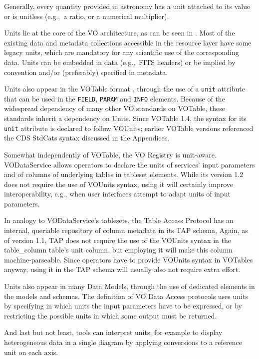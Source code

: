\documentclass[11pt,a4paper]{ivoa}
\def\eg{e.g.,~}
\begin{document}
Generally, every quantity provided in astronomy has a unit attached to
its value or is unitless (\eg a ratio, or a numerical multiplier).

Units lie at the core of the VO architecture, as can be seen in .
Most of the existing data and metadata collections accessible in the resource
layer have some legacy units, which are mandatory for any scientific use of
the corresponding data.  Units can be embedded in data (\eg FITS headers) or be
implied by convention and/or (preferably) specified in metadata.

Units also appear in the VOTable format \citep{2019ivoa.spec.1021O}, through the use
of a {\tt unit} attribute that can be used in the {\tt FIELD}, {\tt PARAM} and {\tt INFO}
elements. Because of the widespread dependency of many other VO standards on VOTable,
these standards inherit a dependency on Units.
Since VOTable 1.4, the syntax for its {\tt unit} attribute is
declared to follow VOUnits; earlier VOTable versions
referenced the CDS StdCats syntax discussed in the Appendices.

Somewhat independently of VOTable, the VO Registry is unit-aware.
VODataService \citep{2021ivoa.spec.1102D} allows operators to declare
the units of services' input parameters and of columns of underlying
tables in tableset elements.  While its version 1.2 does not require the
use of VOUnits syntax, using it will certainly improve interoperability,
e.g., when user interfaces attempt to adapt units of input parameters.

In analogy to VODataService's tablesets, the Table Access Protocol
\citep{2019ivoa.spec.0927D} has an internal, queriable repository of
column metadata in its TAP schema, Again, as of version 1.1, TAP does
not require the use of the VOUnits syntax in the table\_column table's
unit column, but employing it will make this column machine-parseable.
Since operators have to provide VOUnits syntax in VOTables anyway, using
it in the TAP schema will usually also not require extra effort.

Units also appear in many Data Models, through the use of dedicated elements in
the models and schemas.
The definition of VO Data Access protocols uses units by specifying in which units the input
parameters have to be expressed, or by restricting the possible units in which some
output must be returned.

And last but not least, tools can interpret units, for example to display
heterogeneous data in a single diagram by applying conversions to a reference
unit on each axis.
\end{document}

